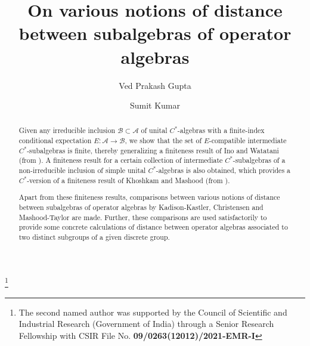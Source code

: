 \documentclass{amsart}
\numberwithin{equation}{section}
\newcommand{\1}{\mathbf{1}}
\newcommand{\mA}{\mathcal{A}}
\newcommand{\mB}{\mathcal{B}}
\begin{document}
\title[On various distances between subalgebras]{On various notions of distance
  between subalgebras of operator algebras}

\author[V P Gupta]{Ved Prakash Gupta} \author[S
  Kumar]{Sumit Kumar} \address{School of Physical Sciences, Jawaharlal Nehru University, New Delhi, INDIA}
 



\thanks{The second named author was  supported
  by the Council of Scientific and Industrial Research (Government
  of India) through a Senior Research Fellowship with
  CSIR File No. {\bf 09/0263(12012)/2021-EMR-I} }
\maketitle
\begin{abstract}
  Given  any irreducible inclusion $\mB \subset \mA$ of unital
$C^*$-algebras with a finite-index conditional expectation $E: \mA \to
\mB$, we show that the set of $E$-compatible intermediate
$C^*$-subalgebras is finite, thereby generalizing a finiteness result
of Ino and Watatani (from \cite{IW}). A finiteness result for a
certain collection of intermediate $C^*$-subalgebras of a
non-irreducible inclusion of simple unital $C^*$-algebras is also
obtained, which provides a $C^*$-version of a finiteness result of
Khoshkam and Mashood (from \cite{KM}).

Apart from these finiteness results, comparisons between
various notions of distance between subalgebras of operator algebras
by Kadison-Kastler, Christensen and Mashood-Taylor are made. Further,
these comparisons are used satisfactorily to provide some concrete
calculations of distance between  operator algebras associated to two
distinct subgroups of a given discrete group. \end{abstract}
\end{document}
